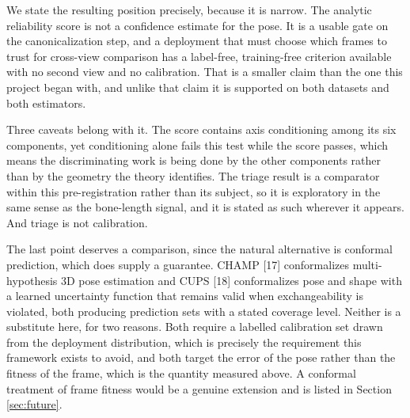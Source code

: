 We state the resulting position precisely, because it is narrow. The analytic reliability score is not a confidence estimate for the pose. It is a usable gate on the canonicalization step, and a deployment that must choose which frames to trust for cross-view comparison has a label-free, training-free criterion available with no second view and no calibration. That is a smaller claim than the one this project began with, and unlike that claim it is supported on both datasets and both estimators.

Three caveats belong with it. The score contains axis conditioning among its six components, yet conditioning alone fails this test while the score passes, which means the discriminating work is being done by the other components rather than by the geometry the theory identifies. The triage result is a comparator within this pre-registration rather than its subject, so it is exploratory in the same sense as the bone-length signal, and it is stated as such wherever it appears. And triage is not calibration.

The last point deserves a comparison, since the natural alternative is conformal prediction, which does supply a guarantee. CHAMP [17] conformalizes multi-hypothesis 3D pose estimation and CUPS [18] conformalizes pose and shape with a learned uncertainty function that remains valid when exchangeability is violated, both producing prediction sets with a stated coverage level. Neither is a substitute here, for two reasons. Both require a labelled calibration set drawn from the deployment distribution, which is precisely the requirement this framework exists to avoid, and both target the error of the pose rather than the fitness of the frame, which is the quantity measured above. A conformal treatment of frame fitness would be a genuine extension and is listed in Section \ref{sec:future}.
